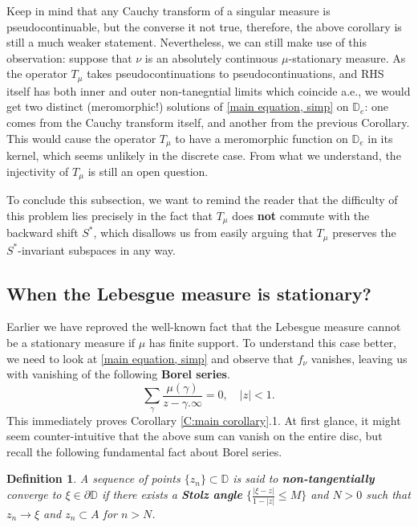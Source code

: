 \documentclass[11pt]{article}
\newtheorem{definition}{Definition}[section]
\begin{document}
Keep in mind that any Cauchy transform of a singular measure is pseudocontinuable, but the converse it not true, therefore, the above corollary is still a much weaker statement. Nevertheless, we can still make use of this observation: suppose that $\nu$ is an absolutely continuous $\mu$-stationary measure. As the operator $T_\mu$ takes pseudocontinuations to pseudocontinuations, and RHS itself has both inner and outer non-tanegntial limits which coincide a.e., we would get two distinct (meromorphic!) solutions of \eqref{main equation, simp} on $\mathbb{D}_e$: one comes from the Cauchy transform itself, and another from the previous Corollary. This would cause the operator $T_\mu$ to have a meromorphic function on $\mathbb{D}_e$ in its kernel, which seems unlikely in the discrete case. From what we understand, the injectivity of $T_\mu$ is still an open question.


To conclude this subsection, we want to remind the reader that the difficulty of this problem lies precisely in the fact that $T_\mu$ does \textbf{not} commute with the backward shift $S^*$, which disallows us from easily arguing that $T_\mu$ preserves the $S^*$-invariant subspaces in any way.
	

\subsection{When the Lebesgue measure is stationary?}

Earlier we have reproved the well-known fact that the Lebesgue measure cannot be a stationary measure if $\mu$ has finite support. To understand this case better, we need to look at \eqref{main equation, simp} and observe that $f_\nu$ vanishes, leaving us with vanishing of the following \textbf{Borel series}.
\begin{equation}
	\label{Lebesgue equation}
	\sum_{\gamma} \frac{\mu(\gamma)}{z - \gamma.\infty} = 0, \quad |z| < 1.
\end{equation}
This immediately proves Corollary \ref{C:main corollary}.1. At first glance, it might seem counter-intuitive that the above sum can vanish on the entire disc, but recall the following fundamental fact about Borel series.

\begin{definition}
	\label{D:non-tangential convergence}
	A sequence of points $\{z_n\} \subset \mathbb{D}$ is said to \textbf{non-tangentially} converge to $\xi \in \partial \mathbb{D}$ if there exists a \textbf{Stolz angle} $\{ \frac{|\xi - z|}{1 - |z|} \le M \}$ and $N > 0$ such that $z_n \rightarrow \xi$ and $z_n \subset A$ for $n > N$.
\end{definition}
\end{document}
